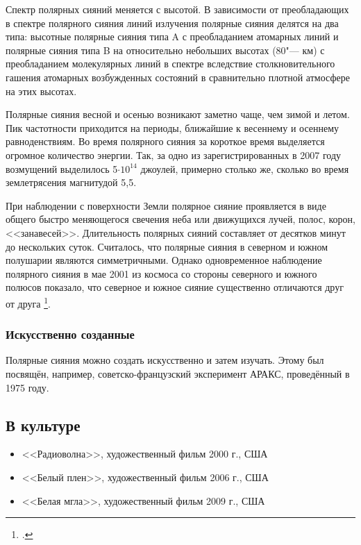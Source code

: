 \documentclass[a4paper,14pt]{article}
\theoremstyle{plain} %
\theoremstyle{definition} %
\theoremstyle{remark} %
\begin{document}
Спектр полярных сияний меняется с высотой. В зависимости от преобладающих в спектре полярного сияния линий излучения полярные сияния делятся на два типа: высотные полярные сияния типа A с преобладанием атомарных линий и полярные сияния типа B на относительно
небольших высотах (80"--- км) с преобладанием молекулярных линий в
спектре вследствие столкновительного гашения атомарных возбужденных состояний в сравнительно плотной атмосфере на этих высотах.

Полярные сияния весной и осенью возникают заметно чаще, чем зимой и летом. Пик частотности приходится на периоды, ближайшие к
весеннему и осеннему равноденствиям. Во время полярного сияния за
короткое время выделяется огромное количество энергии. Так, за одно
из зарегистрированных в 2007 году возмущений выделилось 5$\cdot10^{14}$ джоулей, примерно столько же, сколько во время землетрясения магнитудой
5,5.

При наблюдении с поверхности Земли полярное сияние проявляется в виде общего быстро меняющегося свечения неба или движущихся лучей, полос, корон, <<занавесей>>. Длительность полярных сияний составляет от десятков минут до нескольких суток. Считалось, что полярные сияния в северном и южном полушарии являются симметричными. Однако одновременное наблюдение полярного сияния в мае 2001 из космоса
со стороны северного и южного полюсов показало, что северное и южное сияние существенно отличаются друг от друга \footcite[P. 20]{kruesi2009aurorae}.

\subsubsection{Искусственно созданные}

Полярные сияния можно создать искусственно и затем изучать. Этому был посвящён, например, советско-французский эксперимент АРАКС,
проведённый в 1975 году.

\subsection{В культуре}

\begin{itemize}[label=\textcolor{blue}{\large{\textbullet}}]
    \item <<Радиоволна>>, художественный фильм 2000 г., США
    \item <<Белый плен>>, художественный фильм 2006 г., США
    \item <<Белая мгла>>, художественный фильм 2009 г., США
\end{itemize}

\renewcommand{\refname}{Литература}


\nocite{*}
\addcontentsline{toc}{subsection}{\refname}
\printbibliography
\end{document}
